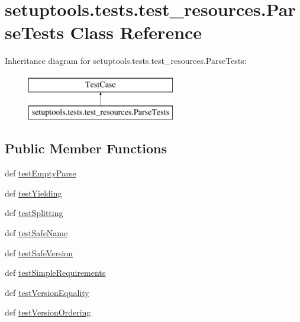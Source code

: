 \hypertarget{classsetuptools_1_1tests_1_1test__resources_1_1ParseTests}{}\section{setuptools.\+tests.\+test\+\_\+resources.\+Parse\+Tests Class Reference}
\label{classsetuptools_1_1tests_1_1test__resources_1_1ParseTests}
Inheritance diagram for setuptools.\+tests.\+test\+\_\+resources.\+Parse\+Tests\+:\begin{figure}[H]
\begin{center}
\leavevmode
\includegraphics[height=2.000000cm]{classsetuptools_1_1tests_1_1test__resources_1_1ParseTests}
\end{center}
\end{figure}
\subsection*{Public Member Functions}
\begin{DoxyCompactItemize}
\item 
def \hyperlink{classsetuptools_1_1tests_1_1test__resources_1_1ParseTests_a6ae860fe3a7a8281b0f41665cc29f544}{test\+Empty\+Parse}
\item 
def \hyperlink{classsetuptools_1_1tests_1_1test__resources_1_1ParseTests_a23b2c17a3b416f773d5d3d7483106d87}{test\+Yielding}
\item 
def \hyperlink{classsetuptools_1_1tests_1_1test__resources_1_1ParseTests_afab65f393a548d2bb4f791befa75f965}{test\+Splitting}
\item 
def \hyperlink{classsetuptools_1_1tests_1_1test__resources_1_1ParseTests_ab1269a3d8071849f4f1a6d71cbd1c6be}{test\+Safe\+Name}
\item 
def \hyperlink{classsetuptools_1_1tests_1_1test__resources_1_1ParseTests_aa93078b38487e9777a5de6529559c5fb}{test\+Safe\+Version}
\item 
def \hyperlink{classsetuptools_1_1tests_1_1test__resources_1_1ParseTests_abda6093713c2dbbbeea76fc5dfde9029}{test\+Simple\+Requirements}
\item 
def \hyperlink{classsetuptools_1_1tests_1_1test__resources_1_1ParseTests_a45c4856cb3c60e427115294c166ae049}{test\+Version\+Equality}
\item 
def \hyperlink{classsetuptools_1_1tests_1_1test__resources_1_1ParseTests_a4e39c4726b462d6a6380fce98b45d946}{test\+Version\+Ordering}
\end{DoxyCompactItemize}


